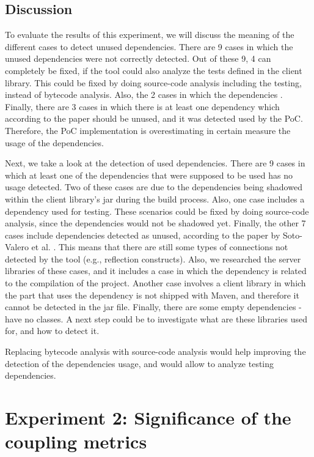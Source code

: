 \subsection{Discussion}
To evaluate the results of this experiment, we will discuss the meaning of the different cases to detect unused dependencies. There are 9 cases in which the unused dependencies were not correctly detected. Out of these 9, 4 can completely be fixed, if the tool could also analyze the tests defined in the client library. This could be fixed by doing source-code analysis including the testing, instead of bytecode analysis. Also, the 2 cases in which the dependencies . Finally, there are 3 cases in which there is at least one dependency which according to the paper should be unused, and it was detected used by the PoC. Therefore, the PoC implementation is overestimating in certain measure the usage of the dependencies.

Next, we take a look at the detection of used dependencies. There are 9 cases in which at least one of the dependencies that were supposed to be used has no usage detected. Two of these cases are due to the dependencies being shadowed within the client library's jar during the build process. Also, one case includes a dependency used for testing. These scenarios could be fixed by doing source-code analysis, since the dependencies would not be shadowed yet. Finally, the other 7 cases include dependencies detected as unused, according to the paper by Soto-Valero et al. \cite{soto2020comprehensive}. This means that there are still some types of connections not detected by the tool (e.g., reflection constructs). Also, we researched the server libraries of these cases, and it includes a case in which the dependency is related to the compilation of the project. Another case involves a client library in which the part that uses the dependency is not shipped with Maven, and therefore it cannot be detected in the jar file. Finally, there are some empty dependencies - have no classes. A next step could be to investigate what are these libraries used for, and how to detect it.

\begin{finding}
	Replacing bytecode analysis with source-code analysis would help improving the detection of the dependencies usage, and would allow to analyze testing dependencies.
	\label{find:source-code-analysis}
\end{finding}

\section{Experiment 2: Significance of the coupling metrics}

